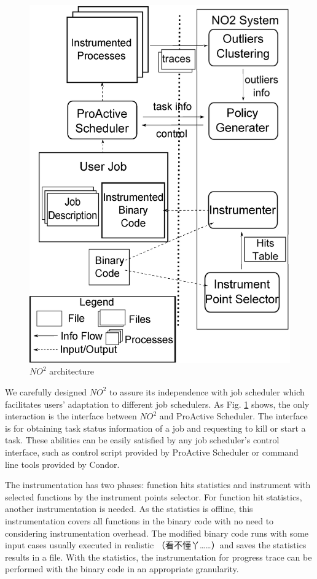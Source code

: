 \begin{figure}
\centering
\includegraphics[width=0.9\columnwidth]{figures/NO2_arch.eps}
\caption{$NO^2$ architecture}
\label{figure:no2arch}
\end{figure}

We carefully designed $NO^2$ to assure its independence with job scheduler which
facilitates users' adaptation to different job schedulers. As Fig.
\ref{figure:no2arch} shows, the only interaction is the interface between $NO^2$ and
ProActive Scheduler. The interface is for obtaining task status information of a job and
requesting to kill or start a task. These abilities can be easily satisfied by any job
scheduler's control interface, such as control script provided by ProActive Scheduler or
command line tools provided by Condor.

The instrumentation has two phases: function hits statistics and instrument with selected
functions by the instrument points selector. For function hit statistics, another
instrumentation is needed. As the statistics is offline, this instrumentation covers all
functions in the binary code with no need to considering instrumentation overhead. The
modified binary code runs with some input cases usually executed in realistic （看不懂丫……）and saves
the statistics results in a file. With the statistics, the instrumentation for progress
trace can be performed with the binary code in an appropriate granularity.

